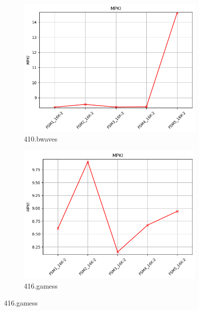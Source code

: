 \documentclass{article}
\begin{document}
\begin{figure}[H]
     \vspace{0.5cm} %
 
     \begin{subfigure}[b]{0.45\textwidth}
         \includegraphics[width=\textwidth]{figures/5_3_b/410.bwaves.cslab_branch_preds_ref.out.png}
         \caption{410.bwaves}
         \label{fig:plot19}
     \end{subfigure}
     \hfill
     \begin{subfigure}[b]{0.45\textwidth}
         \includegraphics[width=\textwidth]{figures/5_3_b/416.gamess.cslab_branch_preds_ref.out.png}
         \caption{416.gamess}
         \label{fig:plot20}
     \end{subfigure}
 

\end{figure}
\end{document}

